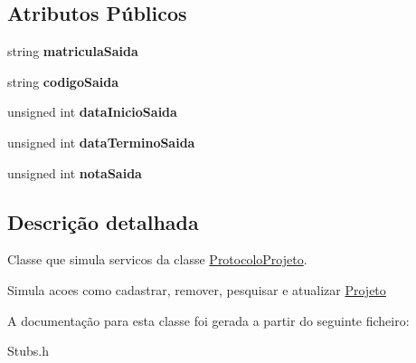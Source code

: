 \subsection*{\-Atributos \-Públicos}
\begin{DoxyCompactItemize}
\item 
\hypertarget{class_stub_projeto_ab36205997d647207e3079facb63d5b13}{
string {\bfseries matricula\-Saida}}
\label{class_stub_projeto_ab36205997d647207e3079facb63d5b13}

\item 
\hypertarget{class_stub_projeto_a66a8eadef8b6bcea586b90f2c19a25f2}{
string {\bfseries codigo\-Saida}}
\label{class_stub_projeto_a66a8eadef8b6bcea586b90f2c19a25f2}

\item 
\hypertarget{class_stub_projeto_a3396b49699e29793ef6beed7307ff6ca}{
unsigned int {\bfseries data\-Inicio\-Saida}}
\label{class_stub_projeto_a3396b49699e29793ef6beed7307ff6ca}

\item 
\hypertarget{class_stub_projeto_a6c86a70a9d3d9dacc6be8bb5fb1f8777}{
unsigned int {\bfseries data\-Termino\-Saida}}
\label{class_stub_projeto_a6c86a70a9d3d9dacc6be8bb5fb1f8777}

\item 
\hypertarget{class_stub_projeto_a87f19311fdb5a96fb3d209e2361cd6c1}{
unsigned int {\bfseries nota\-Saida}}
\label{class_stub_projeto_a87f19311fdb5a96fb3d209e2361cd6c1}

\end{DoxyCompactItemize}


\subsection{\-Descrição detalhada}
\-Classe que simula servicos da classe \hyperlink{class_protocolo_projeto}{\-Protocolo\-Projeto}. 

\-Simula acoes como cadastrar, remover, pesquisar e atualizar \hyperlink{class_projeto}{\-Projeto} 

\-A documentação para esta classe foi gerada a partir do seguinte ficheiro\-:\begin{DoxyCompactItemize}
\item 
\-Stubs.\-h\end{DoxyCompactItemize}
